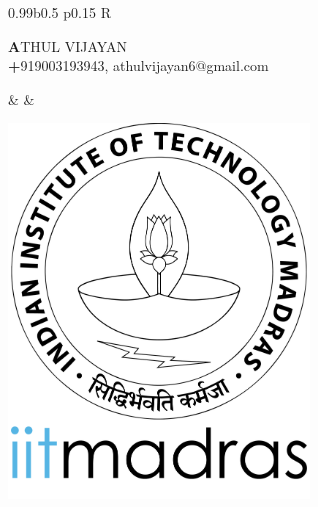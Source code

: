 \documentclass[a4paper,10pt]{article}
\begin{document}

\indent
\begin{tabularx}{0.99\textwidth}{b{} p{} R}
    \specialrule{.05em}{1em}{0em}
    \begin{minipage}{\textwidth}
        \vspace{10pt}
        {\fontsize{12pt}{1em}\selectfont \textbf ATHUL VIJAYAN} \\
        { \textbf +919003193943, athulvijayan6@gmail.com}
    \end{minipage} &  &
    \begin{minipage}[l]{.1\textwidth}%
        \vspace{3pt}
        \includegraphics[width=0.6\textwidth]{../iitmlogo.png}
    \end{minipage}      \\

    \specialrule{.1em}{.05em}{.05em}
\end{tabularx}
\end{document}
